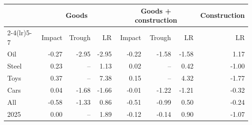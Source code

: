 \begin{tabular}{lrrrrrrr}
\toprule
 & \multicolumn{3}{c}{Goods} & \multicolumn{3}{c}{Goods + construction} & Construction \\
\cmidrule(lr){2-4}\cmidrule(lr){5-7}
 & Impact & Trough & LR & Impact & Trough & LR & LR \\
\midrule
Oil & -0.27 & -2.95 & -2.95 & -0.22 & -1.58 & -1.58 & 1.17 \\
Steel & 0.23 & -- & 1.13 & 0.02 & -- & 0.42 & -1.00 \\
Toys & 0.37 & -- & 7.38 & 0.15 & -- & 4.32 & -1.77 \\
Cars & 0.04 & -1.68 & -1.66 & -0.01 & -1.22 & -1.21 & -0.32 \\
All & -0.58 & -1.33 & 0.86 & -0.51 & -0.99 & 0.50 & -0.24 \\
2025 & 0.00 & -- & 1.89 & -0.12 & -0.14 & 0.90 & -1.07 \\
\bottomrule
\end{tabular}
